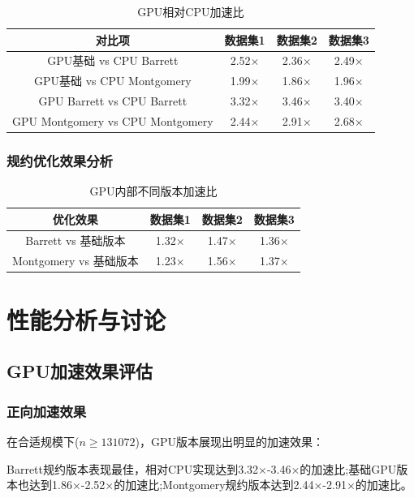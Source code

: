 \documentclass[a4paper]{article}
\begin{document}
\begin{table}[H]
	\centering
	\caption{GPU相对CPU加速比}
	\begin{tabular}{|c|c|c|c|}
		\hline
		\textbf{对比项} & \textbf{数据集1} & \textbf{数据集2} & \textbf{数据集3} \\
		\hline
		GPU基础 vs CPU Barrett & 2.52× & 2.36× & 2.49× \\
		\hline
		GPU基础 vs CPU Montgomery & 1.99× & 1.86× & 1.96× \\
		\hline
		GPU Barrett vs CPU Barrett & 3.32× & 3.46× & 3.40× \\
		\hline
		GPU Montgomery vs CPU Montgomery & 2.44× & 2.91× & 2.68× \\
		\hline
	\end{tabular}
\end{table}

\subsubsection{规约优化效果分析}

\begin{table}[H]
	\centering
	\caption{GPU内部不同版本加速比}
	\begin{tabular}{|c|c|c|c|}
		\hline
		\textbf{优化效果} & \textbf{数据集1} & \textbf{数据集2} & \textbf{数据集3} \\
		\hline
		Barrett vs 基础版本 & 1.32× & 1.47× & 1.36× \\
		\hline
		Montgomery vs 基础版本 & 1.23× & 1.56× & 1.37× \\
		\hline
	\end{tabular}
\end{table}
	
	\section{性能分析与讨论}
	
	\subsection{GPU加速效果评估}
	
	\subsubsection{正向加速效果}
	在合适规模下($n \geq 131072$)，GPU版本展现出明显的加速效果：
	
	Barrett规约版本表现最佳，相对CPU实现达到3.32×-3.46×的加速比;基础GPU版本也达到1.86×-2.52×的加速比;Montgomery规约版本达到2.44×-2.91×的加速比。
	
\end{document}
